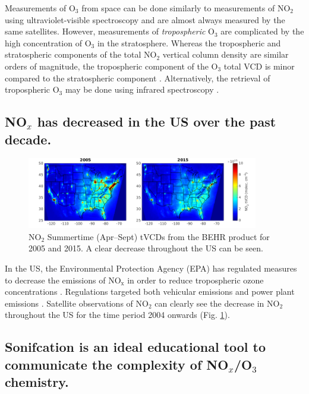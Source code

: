 \documentclass[a4paper,10pt,oneside]{article}
\newcommand{\ce}[1]{$\mathrm{#1}$}
\begin{document}
\begin{sloppy}
Measurements of \ce{O_3} from space can be done similarly to measurements of \ce{NO_2} using ultraviolet-visible spectroscopy and are almost always measured by the same satellites. However, measurements of \emph{tropospheric} \ce{O_3} are complicated by the high concentration of \ce{O_3} in the stratosphere. Whereas the tropospheric and stratospheric components of the total \ce{NO_2} vertical column density are similar orders of magnitude, the tropospheric component of the \ce{O_3} total VCD is minor compared to the stratospheric component \cite{monks-beirle}. Alternatively, the retrieval of tropospheric \ce{O_3} may be done using infrared spectroscopy \cite{nassar08}.

\subsection{NO$_x$ has decreased in the US over the past decade.}
\label{sec:nox-decrease}

\begin{figure}
\centering
\includegraphics[width=0.9\textwidth]{figs/no2vcds.png} 
\caption{\ce{NO_2} Summertime (Apr--Sept) tVCDs from the BEHR product for 2005 and 2015. A clear decrease throughout the US can be seen.}
\label{fig:sat-obs}
\end{figure}

In the US, the Environmental Protection Agency (EPA) has regulated measures to decrease the emissions of \ce{NO_x} in order to reduce tropospheric ozone concentrations \cite{epa99}. Regulations targeted both vehicular emissions \cite{epa16} and power plant emissions \cite{epa-cair}.  Satellite observations of \ce{NO_2} \cite{russell12, kim09, lu15} can clearly see the decrease in \ce{NO_2} throughout the US for the time period 2004 onwards (Fig. \ref{fig:sat-obs}).

\subsection{Sonifcation is an ideal educational tool to communicate the complexity of NO$_x$/O$_3$ chemistry.}


\end{sloppy}
\end{document}
